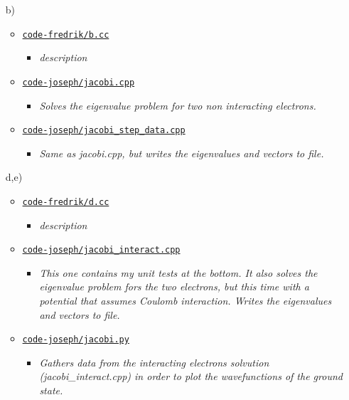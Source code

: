 \documentclass[11pt,a4paper]{article}
\begin{document}
\begin{enumerate}
  \item[b)]
  \begin{itemize}
    \item \href{https://github.com/frxstrem/fys3150/tree/master/project2/code-fredrik/b.cc}{\tt code-fredrik/b.cc}
    \begin{itemize}
      \item {\it description}
    \end{itemize}
    \item \href{https://github.com/frxstrem/fys3150/tree/master/project2/code-joseph/jacobi.cpp}{\tt code-joseph/jacobi.cpp}
    \begin{itemize}
      \item {\it Solves the eigenvalue problem for two non interacting electrons.}
    \end{itemize}
    \item \href{https://github.com/frxstrem/fys3150/tree/master/project2/code-joseph/jacobi_step_data.cpp}{\tt code-joseph/jacobi\_step\_data.cpp}
    \begin{itemize}
      \item {\it Same as jacobi.cpp, but writes the eigenvalues and vectors to file.}
    \end{itemize}
  \end{itemize}

  \item[d,e)]
  \begin{itemize}
    \item \href{https://github.com/frxstrem/fys3150/tree/master/project2/code-fredrik/d.cc}{\tt code-fredrik/d.cc}
    \begin{itemize}
      \item {\it description}
    \end{itemize}
    \item \href{https://github.com/frxstrem/fys3150/tree/master/project2/code-joseph/jacobi_interact.cpp}{\tt code-joseph/jacobi\_interact.cpp}
    \begin{itemize}
      \item {\it This one contains my unit tests at the bottom. It also solves the eigenvalue problem fors the two electrons, but this time with a potential that assumes Coulomb interaction. Writes the eigenvalues and vectors to file.}
    \end{itemize}
    \item \href{https://github.com/frxstrem/fys3150/tree/master/project2/code-joseph/jacobi.py}{\tt code-joseph/jacobi.py}
    \begin{itemize}
      \item {\it Gathers data from the interacting electrons solvution (jacobi_interact.cpp) in order to plot the wavefunctions of the ground state.}
    \end{itemize}
  \end{itemize}
\end{enumerate}

\clearpage

\printbibliography[heading=bibnumbered,title=Bibliography]
\end{document}
